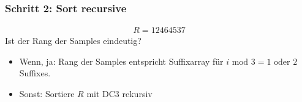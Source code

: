 \documentclass{beamer}
\begin{document}
\begin{frame}
\frametitle{Schritt 2: Sort recursive}
\begin{gather*}
    R = 12464537
\end{gather*}
Ist der Rang der Samples eindeutig?
\begin{itemize}
    \item Wenn, ja: Rang der Samples entspricht Suffixarray für $i \text{ mod } 3 = 1 \text{ oder } 2$ Suffixes.
    \item Sonst: Sortiere $R$ mit DC3 rekursiv
\end{itemize}
\end{frame}

\end{document}
